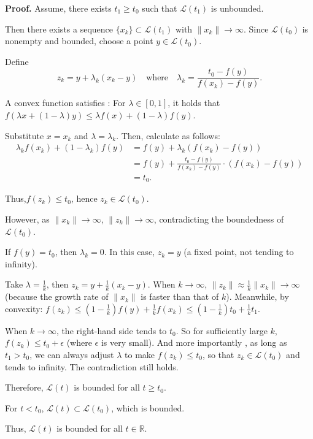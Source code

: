 \documentclass[a4paper, 11pt]{article}
\newenvironment{solution}
    {\textbf{Proof.}}
    {}
\begin{document}
\begin{solution}
	Assume, there exists \( t_1 \geq t_0 \) such that \( \mathcal{L}(t_1) \) is unbounded. 
	
	Then there exists a sequence \( \{x_k\} \subset \mathcal{L}(t_1) \) with \( \|x_k\| \to \infty \). 
	Since \( \mathcal{L}(t_0) \) is nonempty and bounded, choose a point \( y \in \mathcal{L}(t_0) \). 
	
	Define 
$$
	z_k = y + \lambda_k (x_k - y) \quad \text{where} \quad \lambda_k = \frac{t_0 - f(y)}{f(x_k) - f(y)}.
$$

A convex function satisfies : For \( \lambda \in [0, 1] \), it holds that \( f(\lambda x + (1 - \lambda)y) \leq \lambda f(x) + (1 - \lambda)f(y) \).  

Substitute \( x = x_k \) and \( \lambda = \lambda_k \). Then, calculate as follows:  
\begin{align*}
	\lambda_k f(x_k) + (1 - \lambda_k)f(y) 
	&= f(y) + \lambda_k \left( f(x_k) - f(y) \right) \\
	&= f(y) + \frac{t_0 - f(y)}{f(x_k) - f(y)} \cdot \left( f(x_k) - f(y) \right) \\
	&= t_0.
\end{align*}

Thus,\( f(z_k) \leq t_0 \), hence \( z_k \in \mathcal{L}(t_0) \).
	
However, as \( \|x_k\| \to \infty \), \( \|z_k\| \to \infty \), contradicting the boundedness of \( \mathcal{L}(t_0) \). 

If \( f(y) = t_0 \), then \( \lambda_k = 0 \). In this case, \( z_k = y \) (a fixed point, not tending to infinity).  

Take \( \lambda = \frac{1}{k} \), then \( z_k = y + \frac{1}{k}(x_k - y) \). When \( k \to \infty \), \( \| z_k \| \approx \frac{1}{k}\| x_k \| \to \infty \) (because the growth rate of \( \| x_k \| \) is faster than that of \( k \)). Meanwhile, by convexity: \( f(z_k) \leq \left(1 - \frac{1}{k}\right)f(y) + \frac{1}{k}f(x_k) \leq \left(1 - \frac{1}{k}\right)t_0 + \frac{1}{k}t_1 \).  

When \( k \to \infty \), the right-hand side tends to \( t_0 \). So for sufficiently large \( k \), \( f(z_k) \leq t_0 + \epsilon \) (where \( \epsilon \) is very small). And more importantly , as long as \( t_1 > t_0 \), we can always adjust \( \lambda \) to make \( f(z_k) \leq t_0 \), so that \( z_k \in \mathcal{L}(t_0) \) and tends to infinity. The contradiction still holds.  

Therefore, \( \mathcal{L}(t) \) is bounded for all \( t \geq t_0 \). 
	
For \( t < t_0 \), \( \mathcal{L}(t) \subset \mathcal{L}(t_0) \), which is bounded. 
	
Thus, \( \mathcal{L}(t) \) is bounded for all \( t \in \mathbb{R} \).

\end{solution}
\end{document}

